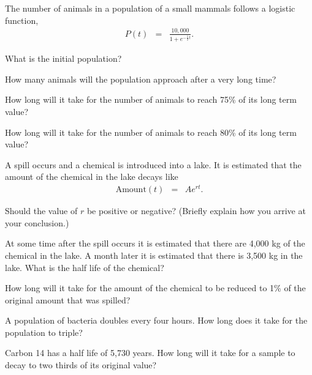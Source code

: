 \begin{problem}
\item The number of animals in a population of a small mammals follows
  a logistic function,
  \begin{eqnarray*}
    P(t) & = & \frac{10,000}{1+e^{-\frac{1}{2}t}}.
  \end{eqnarray*}
  \begin{subproblem}
  \item What is the initial population?
    \vspace{4em}
  \item How many animals will the population approach after a very
    long time?
    \vspace{4em}
  \item How long will it take for the number of animals to reach 75\%
    of its long term value?
    \vfill
  \item How long will it take for the number of animals to reach 80\%
    of its long term value?
    \vfill
  \end{subproblem}

\clearpage

\item A spill occurs and a chemical is introduced into a lake. It is
  estimated that the amount of the chemical in the lake decays like
  \begin{eqnarray*}
    \mathrm{Amount}(t) & = & A e^{rt}.
  \end{eqnarray*}
  \begin{subproblem}
  \item Should the value of $r$ be positive or negative? (Briefly
    explain how you arrive at your conclusion.)
    \vspace{5em}

  \item At some time after the spill occurs it is estimated that there
    are 4,000 kg of the chemical in the lake. A month later it is
    estimated that there is 3,500 kg in the lake. What is the half
    life of the chemical?  \vfill

  \item How long will it take for the amount of the chemical to be
    reduced to 1\% of the original amount that was spilled?
    \vfill
  \end{subproblem}

\clearpage

\item A population of bacteria doubles every four hours. How long does
  it take for the population to triple?
  \vfill

\clearpage

\item Carbon 14 has a half life of 5,730 years. How long will it take
  for a sample to decay to two thirds of its original value?
  \vfill
\clearpage



\end{problem}

